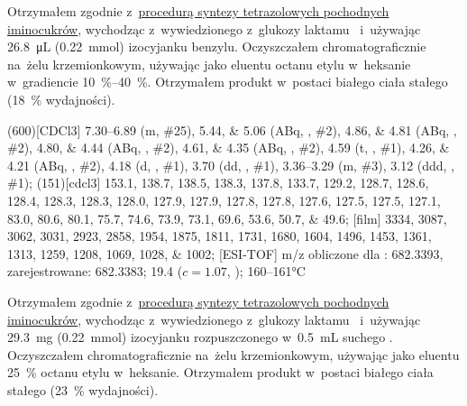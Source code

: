 Otrzymałem zgodnie z~\hyperref[experimental:sugars:schwartz]{procedurą syntezy tetrazolowych
	pochodnych iminocukrów}, wychodząc z~wywiedzionego z~glukozy laktamu~
	i~używając \SI{26.8}{\micro\liter} (\SI{0.22}{\milli\mol}) izocyjanku benzylu.
Oczyszczałem chromatograficznie na~żelu krzemionkowym,
	używając jako eluentu octanu etylu w~heksanie w~gradiencie \SIrange{10}{40}{\percent}.
Otrzymałem produkt w~postaci białego ciała stałego (\SI{18}{\percent} wydajności).

\begin{fullexp}
	\NMR(600)[CDCl3] \numrange{7.30}{6.89} (m, \#{25}), \numlist{5.44;5.06} (ABq, , \#{2}), \numlist{4.86;4.81} (ABq, , \#{2}), \numlist{4.80;4.44} (ABq, , \#{2}), \numlist{4.61;4.35} (ABq, , \#{2}), \num{4.59} (t, , \#{1}), \numlist{4.26;4.21} (ABq, , \#{2}), \num{4.18} (d, , \#{1}), \num{3.70} (dd, , \#{1}), \numrange{3.36}{3.29} (m, \#{3}), \num{3.12} (ddd, , \#{1});
	(151)[cdcl3] \numlist{153.1; 138.7; 138.5; 138.3; 137.8; 133.7; 129.2; 128.7; 128.6; 128.4; 128.3; 128.3; 128.0; 127.9; 127.9; 127.8; 127.8; 127.6; 127.5; 127.5; 127.1; 83.0; 80.6; 80.1; 75.7; 74.6; 73.9; 73.1; 69.6; 53.6; 50.7; 49.6};
	[film] \numlist{3334; 3087; 3062; 3031; 2923; 2858; 1954; 1875; 1811; 1731; 1680; 1604; 1496; 1453; 1361; 1313; 1259; 1208; 1069; 1028; 1002};
	[ESI-TOF] m/z obliczone dla : \num{682.3393}, zarejestrowane: \num{682.3383};
	\data{[$\alpha^{23}_D$]~$=$} \num{19.4} ($c = 1.07$, );
	 \numrange{160}{161}\si{\celsius}
\end{fullexp}

Otrzymałem zgodnie z~\hyperref[experimental:sugars:schwartz]{procedurą syntezy tetrazolowych
	pochodnych iminocukrów}, wychodząc z~wywiedzionego z~glukozy laktamu~
	i~używając \SI{29.3}{\milli\gram} (\SI{0.22}{\milli\mol}) izocyjanku 
	rozpuszczonego w~\SI{0.5}{\milli\liter} suchego .
Oczyszczałem chromatograficznie na~żelu krzemionkowym,
	używając jako eluentu \SI{25}{\percent} octanu etylu w~heksanie.
Otrzymałem produkt w~postaci białego ciała stałego (\SI{23}{\percent} wydajności).

